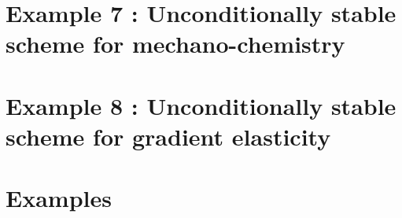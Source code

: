 \documentclass[twoside]{book}
\begin{document}
\chapter{Example 7 \-: Unconditionally stable scheme for mechano-\/chemistry}
\label{example7}
\hypertarget{example7}{}

\chapter{Example 8 \-: Unconditionally stable scheme for gradient elasticity}
\label{example8}
\hypertarget{example8}{}

\chapter{Examples}
\label{examples}
\hypertarget{examples}{}


\newpage
{}
{}
\printindex
\end{document}
